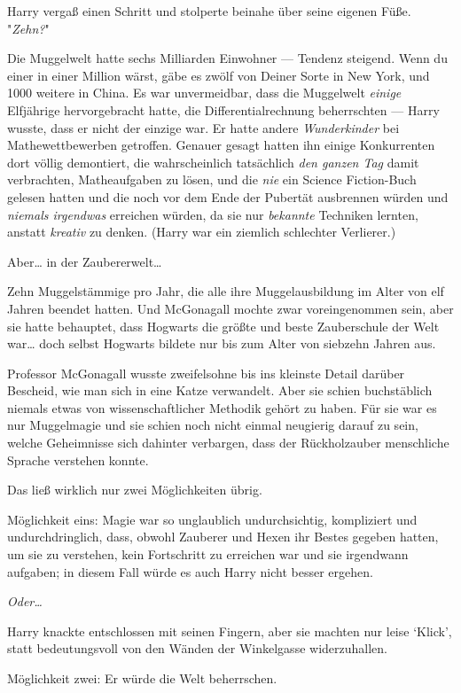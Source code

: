 {Harry vergaß einen Schritt und stolperte beinahe über seine eigenen Füße. "\emph{Zehn?}"

Die Muggelwelt hatte sechs Milliarden Einwohner --- Tendenz steigend. Wenn du einer in einer Million wärst, gäbe es zwölf von Deiner Sorte in New York, und 1000 weitere in China. Es war unvermeidbar, dass die Muggelwelt \emph{einige} Elfjährige hervorgebracht hatte, die Differentialrechnung beherrschten --- Harry wusste, dass er nicht der einzige war. Er hatte andere \emph{Wunderkinder} bei Mathewettbewerben getroffen. Genauer gesagt hatten ihn einige Konkurrenten dort völlig demontiert, die wahrscheinlich tatsächlich \emph{den ganzen Tag} damit verbrachten, Matheaufgaben zu lösen, und die \emph{nie} ein Science Fiction-Buch gelesen hatten und die noch vor dem Ende der Pubertät ausbrennen würden und \emph{niemals irgendwas} erreichen würden, da sie nur \emph{bekannte} Techniken lernten, anstatt \emph{kreativ} zu denken. (Harry war ein ziemlich schlechter Verlierer.)

Aber… in der Zaubererwelt…

Zehn Muggelstämmige pro Jahr, die alle ihre Muggelausbildung im Alter von elf Jahren beendet hatten. Und McGonagall mochte zwar voreingenommen sein, aber sie hatte behauptet, dass Hogwarts die größte und beste Zauberschule der Welt war… doch selbst Hogwarts bildete nur bis zum Alter von siebzehn Jahren aus.

Professor McGonagall wusste zweifelsohne bis ins kleinste Detail darüber Bescheid, wie man sich in eine Katze verwandelt. Aber sie schien buchstäblich niemals etwas von wissenschaftlicher Methodik gehört zu haben. Für sie war es nur Muggelmagie und sie schien noch nicht einmal neugierig darauf zu sein, welche Geheimnisse sich dahinter verbargen, dass der Rückholzauber menschliche Sprache verstehen konnte.

Das ließ wirklich nur zwei Möglichkeiten übrig.

Möglichkeit eins: Magie war so unglaublich undurchsichtig, kompliziert und undurchdringlich, dass, obwohl Zauberer und Hexen ihr Bestes gegeben hatten, um sie zu verstehen, kein Fortschritt zu erreichen war und sie irgendwann aufgaben; in diesem Fall würde es auch Harry nicht besser ergehen.

\emph{Oder…}

Harry knackte entschlossen mit seinen Fingern, aber sie machten nur leise `Klick', statt bedeutungsvoll von den Wänden der Winkelgasse widerzuhallen.

Möglichkeit zwei: Er würde die Welt beherrschen.

}
